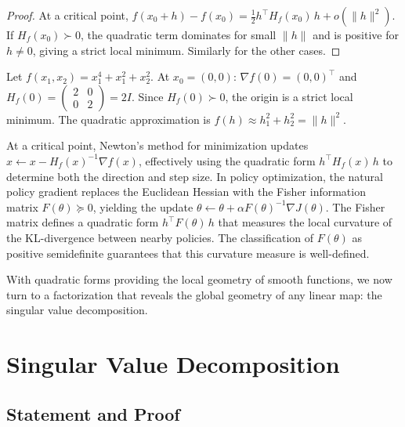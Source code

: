 \documentclass[11pt,a4paper]{article}
\begin{document}
\begin{proof}
At a critical point, $f(x_0 + h) - f(x_0) = \frac{1}{2}h^\top H_f(x_0)\,h
+ o(\|h\|^2)$.  If $H_f(x_0) \succ 0$, the quadratic term dominates
for small $\|h\|$ and is positive for $h \neq 0$, giving a strict local
minimum.  Similarly for the other cases.
\end{proof}

\begin{example}
\label{ex:quad_approx}
Let $f(x_1, x_2) = x_1^4 + x_1^2 + x_2^2$.  At $x_0 = (0,0)$:
$\nabla f(0) = (0, 0)^\top$ and
$H_f(0) = \begin{pmatrix} 2 & 0 \\ 0 & 2 \end{pmatrix} = 2I$.
Since $H_f(0) \succ 0$, the origin is a strict local minimum.
The quadratic approximation is $f(h) \approx h_1^2 + h_2^2 = \|h\|^2$.
\end{example}

\begin{rlconnection}[title={Newton's Method and the Natural Policy Gradient}]
At a critical point, Newton's method for minimization updates
$x \leftarrow x - H_f(x)^{-1}\nabla f(x)$, effectively using the
quadratic form $h^\top H_f(x)\,h$ to determine both the direction and
step size.  In policy optimization, the natural policy gradient replaces
the Euclidean Hessian with the Fisher information matrix
$F(\theta) \succeq 0$, yielding the update
$\theta \leftarrow \theta + \alpha F(\theta)^{-1}\nabla J(\theta)$.
The Fisher matrix defines a quadratic form $h^\top F(\theta)\, h$
that measures the local curvature of the KL-divergence between nearby
policies.  The classification of $F(\theta)$ as positive semidefinite
guarantees that this curvature measure is well-defined.
\end{rlconnection}

With quadratic forms providing the local geometry of smooth functions,
we now turn to a factorization that reveals the global geometry of
any linear map: the singular value decomposition.

\section{Singular Value Decomposition}
\label{sec:svd}

\subsection{Statement and Proof}
\end{document}
